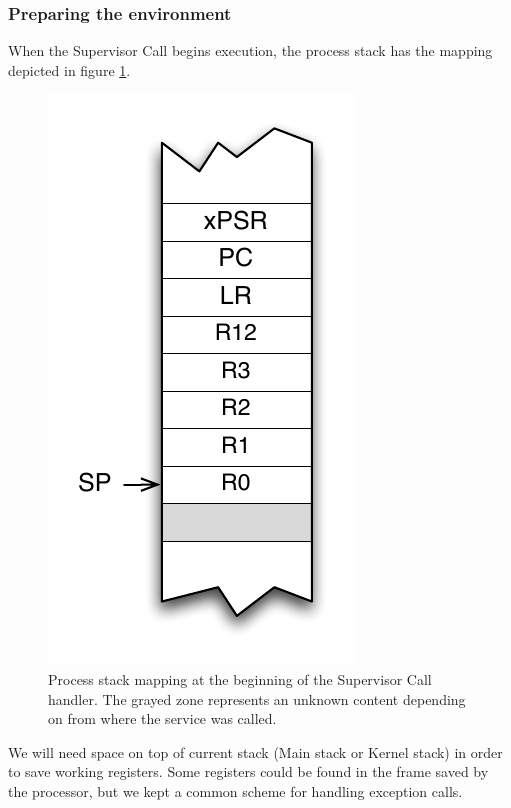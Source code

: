 \subsubsection{Preparing the environment}

When the Supervisor Call begins execution, the process stack has the mapping depicted in figure \ref{fig:CM4StackAfterInvoque}.

\begin{figure}[htbp] %
\begin{minipage}{0.5\textwidth}
    \centering
  \includegraphics[scale=.6]{pictures/CM4StackAfterInvoque} 
\end{minipage}
\begin{minipage}{0.5\textwidth}
   \caption{Process stack mapping at the beginning of the Supervisor Call handler. The grayed zone represents an unknown content depending on from where the service was called.}\label{fig:CM4StackAfterInvoque}
\end{minipage}
\end{figure}

We will need space on top of current stack (Main stack or Kernel stack)  in order to save working registers.
Some registers could be found in the frame saved by the processor, but we kept a common scheme for handling exception calls.


